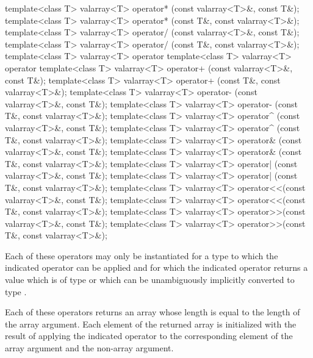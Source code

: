 %
%
%
%
%
%
%
%
%
%
\begin{itemdecl}
template<class T> valarray<T> operator* (const valarray<T>&, const T&);
template<class T> valarray<T> operator* (const T&, const valarray<T>&);
template<class T> valarray<T> operator/ (const valarray<T>&, const T&);
template<class T> valarray<T> operator/ (const T&, const valarray<T>&);
template<class T> valarray<T> operator%
template<class T> valarray<T> operator%
template<class T> valarray<T> operator+ (const valarray<T>&, const T&);
template<class T> valarray<T> operator+ (const T&, const valarray<T>&);
template<class T> valarray<T> operator- (const valarray<T>&, const T&);
template<class T> valarray<T> operator- (const T&, const valarray<T>&);
template<class T> valarray<T> operator^ (const valarray<T>&, const T&);
template<class T> valarray<T> operator^ (const T&, const valarray<T>&);
template<class T> valarray<T> operator& (const valarray<T>&, const T&);
template<class T> valarray<T> operator& (const T&, const valarray<T>&);
template<class T> valarray<T> operator| (const valarray<T>&, const T&);
template<class T> valarray<T> operator| (const T&, const valarray<T>&);
template<class T> valarray<T> operator<<(const valarray<T>&, const T&);
template<class T> valarray<T> operator<<(const T&, const valarray<T>&);
template<class T> valarray<T> operator>>(const valarray<T>&, const T&);
template<class T> valarray<T> operator>>(const T&, const valarray<T>&);
\end{itemdecl}

\begin{itemdescr}
\pnum
Each of these operators may only be instantiated for a type 
to which the indicated operator can be applied and for which
the indicated operator returns a value which is of type 
or which can be unambiguously implicitly converted to type .

\pnum
Each of these operators returns an array whose length is equal to the
length of the array argument.
Each element of the returned array is
initialized with the result of applying the indicated operator to the
corresponding element of the array argument and the non-array argument.
\end{itemdescr}

